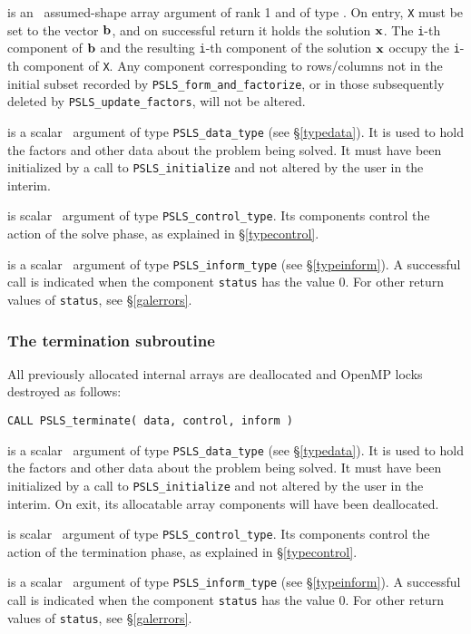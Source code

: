 \documentclass{galahad}
\newcommand{\packagename}{PSLS}
\begin{document}
\begin{description}

 is an \intentinout\ assumed-shape array argument of rank 1
and of type \realdp.  On entry, {\tt X} must be set
to the vector ${\mathbf{b}}$, and on successful return it holds
the solution ${\mathbf{x}}$. The {\tt i}-th component of ${\mathbf{b}}$ and the resulting
{\tt i}-th component of the solution ${\mathbf{x}}$
occupy the {\tt i}-th component of {\tt X}. 
Any component corresponding to rows/columns not in the initial subset
recorded by {\tt  \packagename\_form\_and\_factorize},
or in those subsequently deleted
by {\tt \packagename\_update\_factors}, will not be altered.

 is a scalar \intentinout\ argument of type
{\tt \packagename\_data\_type}
(see \S\ref{typedata}). It is used to hold the factors and other
data about the problem being solved.
It must have been initialized by a call to
{\tt \packagename\_ini\-tialize} and not altered by the user in the interim.

 is scalar \intentin\ argument of type
{\tt \packagename\_control\_type}. Its components control the action
of the solve phase, as explained in
\S\ref{typecontrol}.

 is a scalar \intentinout\ argument of type
{\tt \packagename\_inform\_type}
(see \S\ref{typeinform}).
A successful call is indicated when the  component {\tt status} has the value 0.
For other return values of {\tt status}, see \S\ref{galerrors}.

\end{description}


\subsubsection{The termination subroutine}
All previously allocated internal arrays are deallocated and OpenMP locks
destroyed as follows:

\hskip0.5in
{\tt CALL \packagename\_terminate( data, control, inform )}

\begin{description}

 is a scalar \intentinout\ argument of type
{\tt \packagename\_data\_type}
(see \S\ref{typedata}). It is used to hold the factors and other
data about the problem being solved.
It must have been initialized by a call to
{\tt \packagename\_ini\-tialize} and not altered by the user in the interim.
On exit, its allocatable array components will have been deallocated.

 is scalar \intentin\ argument of type
{\tt \packagename\_control\_type}. Its components control the action
of the termination phase, as explained in
\S\ref{typecontrol}.

 is a scalar \intentinout\ argument of type
{\tt \packagename\_inform\_type}
(see \S\ref{typeinform}).
A successful call is indicated when the  component {\tt status} has the value 0.
For other return values of {\tt status}, see \S\ref{galerrors}.

\end{description}
\end{document}
